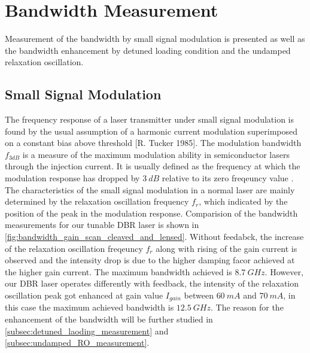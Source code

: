 \section{Bandwidth Measurement}\label{sec:bandwidth_measurement}
Measurement of the bandwidth by small signal modulation is presented as well as the bandwidth enhancement by detuned loading condition and the undamped relaxation oscillation.
\subsection{Small Signal Modulation}
The frequency response of a laser transmitter under small signal modulation is found by the usual assumption of a harmonic current modulation superimposed on a constant bias above threshold [R. Tucker 1985]. The modulation bandwidth $f_{3dB}$ is a measure of the maximum modulation ability in semiconductor lasers through the injection current. It is usually defined as the frequency at which the modulation response has dropped by $3 \ dB$ relative to its zero freqeuncy value \cite{ohtsubo2012semiconductor, agrawal2013semiconductor}. The characteristics of the small signal modulation in a normal laser are mainly determined by the relaxation oscillation frequency $f_r$, which indicated by the position of the peak in the modulation response. Comparision of the bandwidth measurements for our tunable DBR laser is shown in \autoref{fig:bandwidth_gain_scan_cleaved_and_lensed}. Without feedabck, the increase of the relaxation oscillation freqeuncy $f_r$ along with rising of the gain current is observed and the intensity drop is due to the higher damping facor achieved at the higher gain current. The maximum bandwidth achieved is $8.7 \ GHz$. However, our DBR laser operates differently with feedback, the intensity of the relaxation oscillation peak got enhanced at gain value $I_{gain}$ between $60 \ mA$ and $70 \ mA$, in this case the maximum achieved bandwidth is $12.5 \ GHz$. The reason for the enhancement of the bandwidth will be further studied in \autoref{subsec:detuned_laoding_measurement} and \autoref{subsec:undamped_RO_measurement}.
